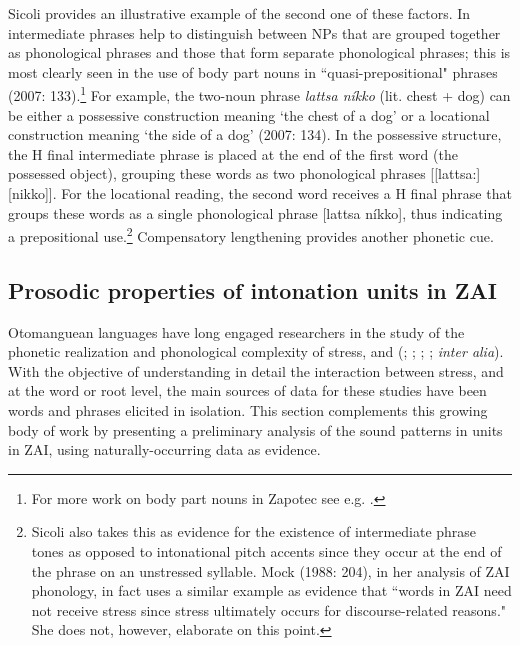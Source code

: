 Sicoli provides an illustrative example of the second one of these factors. In   intermediate phrases help to distinguish between NPs that are grouped together as phonological phrases and those that form separate phonological phrases; this is most clearly seen in the use of body part nouns in ``quasi-prepositional" phrases (2007: 133).\footnote{For more work on body part nouns in Zapotec see e.g. \citet{maclaury1989,lillehaugen2006}.} For example, the two-noun phrase \textit{lattsa n\'{i}kko} (lit. chest + dog) can be either a possessive construction meaning `the chest of a dog' or a locational construction meaning `the side of a dog' (2007: 134). In the possessive structure, the H final intermediate phrase  is placed at the end of the first word (the possessed object), grouping these words as two phonological phrases [[lattsa:][nikko]]. For the locational reading, the second word receives a H final phrase  that groups these words as a single phonological phrase [lattsa n\'{i}kko], thus indicating a prepositional use.\footnote{Sicoli also takes this as evidence for the existence of intermediate phrase tones as opposed to intonational pitch accents since they occur at the end of the phrase on an unstressed syllable. Mock (1988: 204), in her analysis of ZAI phonology, in fact uses a similar example as evidence that ``words in ZAI need not receive stress since stress ultimately occurs for discourse-related reasons." She does not, however, elaborate on this point.} Compensatory lengthening provides another phonetic cue. 


\subsection{Prosodic properties of intonation units in ZAI}\label{stressrule}

Otomanguean languages have long engaged researchers in the study of the phonetic realization and phonological complexity of stress,  and  (\citealt{arellanes2009}; \citealt{avelino2004}; \citealt{chavezpeon2010}; \citealt{mock1988}; \textit{inter alia}). With the objective of understanding in detail the interaction between stress,  and  at the word or root level, the main sources of data for these studies have been words and phrases elicited in isolation. This section complements this growing body of work by presenting a preliminary analysis of the sound patterns in  units in ZAI, using naturally-occurring data as evidence.

